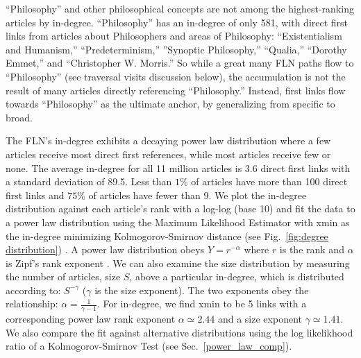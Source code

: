 \documentclass[pre,twocolumn,twoside,superscriptaddress,floatfix]{revtex4-1}
\begin{document}
{``Philosophy'' and other philosophical concepts
are not among the highest-ranking articles by in-degree.
``Philosophy'' has an in-degree of only 581, with direct first links from articles about Philosophers and areas of Philosophy: ``Existentialism and Humanism,'' ``Predeterminism,'' ''Synoptic Philosophy,'' ``Qualia,'' ``Dorothy Emmet,'' and ``Christopher W. Morris.''
So while a great many FLN paths flow to 
``Philosophy'' (see traversal visits discussion below), 
the accumulation is not the 
result of many articles directly referencing ``Philosophy.'' 
Instead, first links flow towards ``Philosophy'' as the 
ultimate anchor, by generalizing from specific to broad.

The FLN's in-degree exhibits a decaying power law distribution where a few articles 
receive most direct first references, while most articles receive few or none.
The average in-degree for all 11 million articles is 3.6 direct first links with a standard deviation of 89.5.
Less than $1\%$ of articles have more than 100 direct first links and $75\%$ of articles
have fewer than 9. 
We plot the in-degree distribution against each article's rank with a log-log (base 10) and fit the data to a power law 
distribution using the Maximum Likelihood Estimator with xmin as the in-degree minimizing Kolmogorov-Smirnov distance
(see Fig.~\ref{fig:degree distribution}) 
\cite{clauset2009power, alstott2014powerlaw}
.
A power law distribution obeys $Y = r^{-\alpha}$ where $r$ is the rank and $\alpha$ is Zipf's rank
exponent
\cite{zipf1949human}
. We can also examine the size distribution by measuring the number of articles, size $S$, above
a particular in-degree, which is distributed according to: $S^{-\gamma}$ ($\gamma$ is the size exponent). 
The two exponents obey the relationship: $\alpha = \frac{1}{\gamma -1}$.
For in-degree, we find xmin to be 5 links with a corresponding power law rank exponent $\alpha \simeq 2.44$ and a size exponent $\gamma \simeq 1.41$. 
We also compare the fit against alternative distributions using the log likelikhood ratio of a Kolmogorov-Smirnov Test 
(see Sec.~\ref{power_law_comp}).

}
\end{document}
